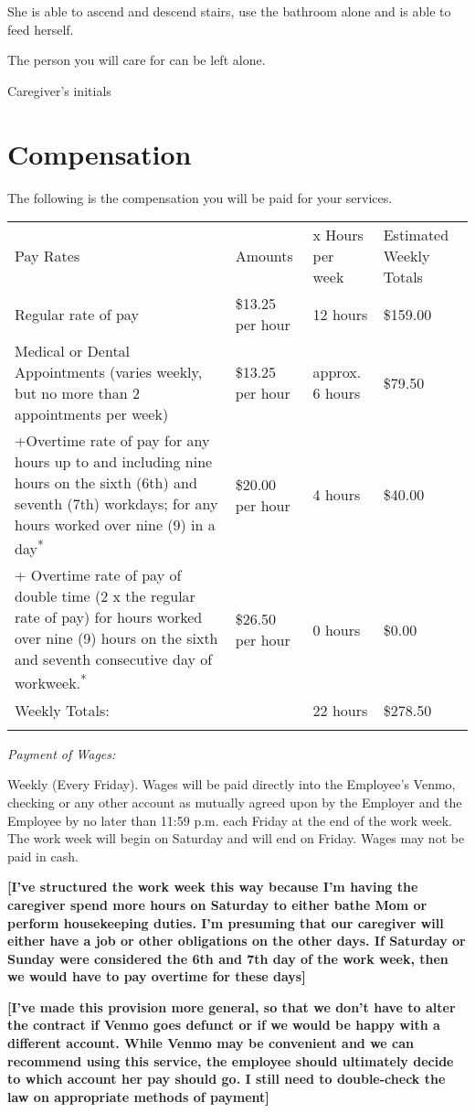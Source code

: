 \documentclass[]{article}
\newcommand{\toprule}{\hrulefill}
\newcommand{\bottomrule}{\hrulefill}
\newcommand{\initialfillin}{\hspace{0.2cm}\makebox[1.5cm]{\hrulefill}}
\begin{document}
She is able to ascend and descend stairs, use the bathroom alone and is able to feed herself.

The person you will care for can be left alone.

Caregiver's initials \initialfillin{}

\section{Compensation}

The following is the compensation you will be paid for your services.

\begin{tabular}[c]{@{}llll@{}}
\toprule
Pay Rates & Amounts & x Hours per week & Estimated Weekly
Totals\tabularnewline
Regular rate of pay & \$13.25 per hour & 12 hours &
\$159.00\tabularnewline
Medical or Dental Appointments (varies weekly, but no more than 2
appointments per week) & \$13.25 per hour & approx. 6 hours &
\$79.50\tabularnewline
+Overtime rate of pay for any hours up to and including nine hours on
the sixth (6th) and seventh (7th) workdays; for any hours worked over
nine (9) in a day\textsuperscript{*} & \$20.00 per hour & 4 hours &
\$40.00\tabularnewline
+ Overtime rate of pay of double time (2 x the regular rate of pay) for
hours worked over nine (9) hours on the sixth and seventh consecutive
day of workweek.\textsuperscript{*} & \$26.50 per hour & 0 hours &
\$0.00\tabularnewline
Weekly Totals: & & 22 hours & \$278.50\tabularnewline
\bottomrule
\end{tabular}

\emph{Payment of Wages:}

Weekly (Every Friday). Wages will be paid directly into the Employee's
Venmo, checking or any other account as mutually agreed upon by the
Employer and the Employee by no later than 11:59 p.m. each Friday at the
end of the work week. The work week will begin on Saturday and will end
on Friday. Wages may not be paid in cash.

\textbf{{[}I've structured the work week this way because I'm having the
caregiver spend more hours on Saturday to either bathe Mom or perform
housekeeping duties. I'm presuming that our caregiver will either have a
job or other obligations on the other days. If Saturday or Sunday were
considered the 6th and 7th day of the work week, then we would have to
pay overtime for these days{]}}

\textbf{{[}I've made this provision more general, so that we don't have
to alter the contract if Venmo goes defunct or if we would be happy with
a different account. While Venmo may be convenient and we can recommend
using this service, the employee should ultimately decide to which
account her pay should go. I still need to double-check the law on
appropriate methods of payment{]} }
\end{document}
